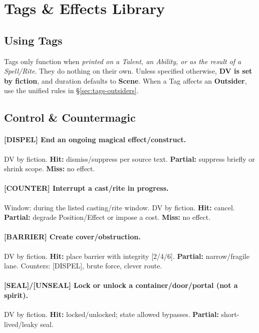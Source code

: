 

\section{Tags \& Effects Library}
\label{sec:tags}

\subsection{Using Tags}
Tags only function when \emph{printed on a Talent, an Ability, or as the result of a Spell/Rite}. 
They do nothing on their own. 
Unless specified otherwise, \textbf{DV is set by fiction}, and duration defaults to \textbf{Scene}. 
When a Tag affects an \textbf{Outsider}, use the unified rules in \S\ref{sec:tags-outsiders}.

\subsection{Control \& Countermagic}
\paragraph{[DISPEL] End an ongoing magical effect/construct.}
DV by fiction. \textbf{Hit:} dismiss/suppress per source text. \textbf{Partial:} suppress briefly or shrink scope. \textbf{Miss:} no effect.

\paragraph{[COUNTER] Interrupt a cast/rite in progress.}
Window: during the listed casting/rite window. DV by fiction. \textbf{Hit:} cancel. \textbf{Partial:} degrade Position/Effect or impose a cost. \textbf{Miss:} no effect.

\paragraph{[BARRIER] Create cover/obstruction.}
DV by fiction. \textbf{Hit:} place barrier with integrity [2/4/6]. \textbf{Partial:} narrow/fragile lane. Counters: [DISPEL], brute force, clever route.

\paragraph{[SEAL]/[UNSEAL] Lock or unlock a container/door/portal (not a spirit).}
DV by fiction. \textbf{Hit:} locked/unlocked; state allowed bypasses. \textbf{Partial:} short-lived/leaky seal.

